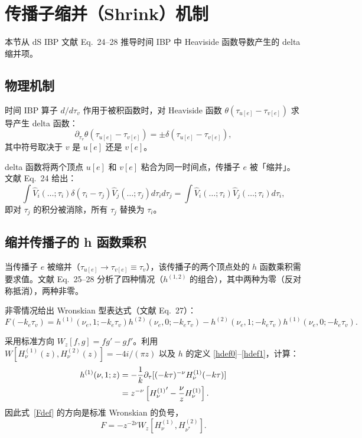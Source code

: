 ﻿\documentclass[a4paper,11pt]{article}
\begin{document}
\section{传播子缩并（Shrink）机制}

本节从 dS IBP 文献 Eq.~24--28 推导时间 IBP 中 Heaviside 函数导数产生的 delta 缩并项。

\subsection{物理机制}

时间 IBP 算子 $d/d\tau_v$ 作用于被积函数时，对 Heaviside 函数 $\theta(\tau_{u[e]} - \tau_{v[e]})$ 求导产生 delta 函数：
\begin{equation}
  \partial_{\tau_v} \theta(\tau_{u[e]} - \tau_{v[e]}) = \pm \delta(\tau_{u[e]} - \tau_{v[e]}),
  \label{thetaderiv}
\end{equation}
其中符号取决于 $v$ 是 $u[e]$ 还是 $v[e]$。

delta 函数将两个顶点 $u[e]$ 和 $v[e]$ 粘合为同一时间点，传播子 $e$ 被「缩并」。文献 Eq.~24 给出：
\begin{equation}
  \int \hat{V}_i(\ldots;\tau_i) \delta(\tau_i - \tau_j) \hat{V}_j(\ldots;\tau_j) d\tau_i d\tau_j = \int \hat{V}_i(\ldots;\tau_i) \hat{V}_j(\ldots;\tau_i) d\tau_i,
  \label{deltacollapse}
\end{equation}
即对 $\tau_j$ 的积分被消除，所有 $\tau_j$ 替换为 $\tau_i$。

\subsection{缩并传播子的 h 函数乘积}

当传播子 $e$ 被缩并（$\tau_{u[e]} \to \tau_{v[e]} \equiv \tau_v$），该传播子的两个顶点处的 $h$ 函数乘积需要求值。文献 Eq.~25--28 分析了四种情况（$h^{(1,2)}$ 的组合），其中两种为零（反对称抵消），两种非零。

非零情况给出 Wronskian 型表达式（文献 Eq.~27）：
\begin{equation}
  F(-k_e\tau_v) = h^{(1)}(\nu_e, 1; -k_e\tau_v) h^{(2)}(\nu_e, 0; -k_e\tau_v) - h^{(2)}(\nu_e, 1; -k_e\tau_v) h^{(1)}(\nu_e, 0; -k_e\tau_v).
  \label{Fdef}
\end{equation}

采用标准方向 $W_z[f,g]=fg'-gf'$。利用 $W[H_\nu^{(1)}(z), H_\nu^{(2)}(z)] = -4i/(\pi z)$ 以及 $h$ 的定义 \eqref{hdef0}--\eqref{hdef1}，计算：
\begin{align}
  h^{(1)}(\nu, 1; z) &= -\frac{1}{k} \partial_\tau [(-k\tau)^{-\nu} H_\nu^{(1)}(-k\tau)] \notag \\
  &= z^{-\nu}\left[{H_\nu^{(1)}}'-\frac{\nu}{z}H_\nu^{(1)}\right].
\end{align}
因此式~\eqref{Fdef} 的方向是标准 Wronskian 的负号，
\begin{equation}
 F=-z^{-2\nu}W_z[H_\nu^{(1)},H_{\nu^*}^{(2)}].
 \label{FminusWronskian}
\end{equation}
\end{document}
